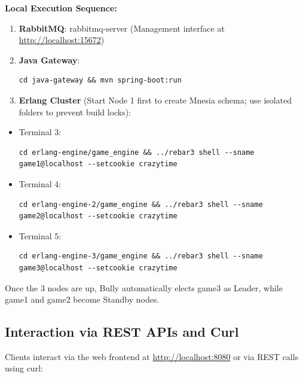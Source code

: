 \documentclass[12pt,a4paper]{article}
\begin{document}
\textbf{Local Execution Sequence:}
\begin{enumerate}
    \item \textbf{RabbitMQ}: rabbitmq-server (Management interface at \url{http://localhost:15672})
    \item \textbf{Java Gateway}: 
\begin{lstlisting}[basicstyle=\ttfamily, breaklines=true]
cd java-gateway && mvn spring-boot:run
\end{lstlisting}
    \item \textbf{Erlang Cluster} (Start Node 1 first to create Mnesia schema; use isolated folders to prevent build locks):
\end{enumerate}
\begin{itemize}
    \item Terminal 3: 
\begin{lstlisting}[basicstyle=\ttfamily, breaklines=true]
cd erlang-engine/game_engine && ../rebar3 shell --sname game1@localhost --setcookie crazytime
\end{lstlisting}
    \item Terminal 4: 
\begin{lstlisting}[basicstyle=\ttfamily, breaklines=true]
cd erlang-engine-2/game_engine && ../rebar3 shell --sname game2@localhost --setcookie crazytime
\end{lstlisting}
    \item Terminal 5: 
\begin{lstlisting}[basicstyle=\ttfamily, breaklines=true]
cd erlang-engine-3/game_engine && ../rebar3 shell --sname game3@localhost --setcookie crazytime
\end{lstlisting}
\end{itemize}
Once the 3 nodes are up, Bully automatically elects game3 as Leader, while game1 and game2 become Standby nodes.

\subsection{Interaction via REST APIs and Curl}
Clients interact via the web frontend at \url{http://localhost:8080} or via REST calls using curl:
\end{document}
